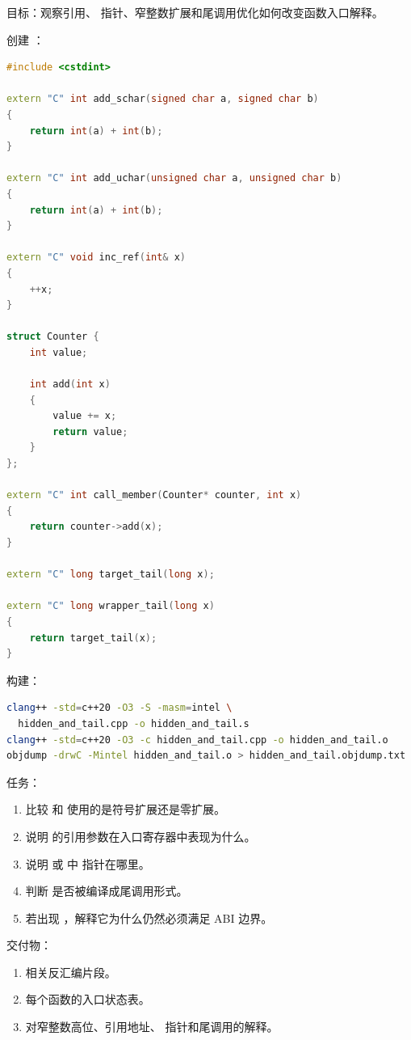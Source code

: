 \begin{labbox}
目标：观察引用、 指针、窄整数扩展和尾调用优化如何改变函数入口解释。

创建 ：

\begin{lstlisting}[language=C++]
#include <cstdint>

extern "C" int add_schar(signed char a, signed char b)
{
    return int(a) + int(b);
}

extern "C" int add_uchar(unsigned char a, unsigned char b)
{
    return int(a) + int(b);
}

extern "C" void inc_ref(int& x)
{
    ++x;
}

struct Counter {
    int value;

    int add(int x)
    {
        value += x;
        return value;
    }
};

extern "C" int call_member(Counter* counter, int x)
{
    return counter->add(x);
}

extern "C" long target_tail(long x);

extern "C" long wrapper_tail(long x)
{
    return target_tail(x);
}
\end{lstlisting}

构建：

\begin{lstlisting}[language=bash]
clang++ -std=c++20 -O3 -S -masm=intel \
  hidden_and_tail.cpp -o hidden_and_tail.s
clang++ -std=c++20 -O3 -c hidden_and_tail.cpp -o hidden_and_tail.o
objdump -drwC -Mintel hidden_and_tail.o > hidden_and_tail.objdump.txt
\end{lstlisting}

任务：

\begin{enumerate}
  \item 比较  和  使用的是符号扩展还是零扩展。
  \item 说明  的引用参数在入口寄存器中表现为什么。
  \item 说明  或  中  指针在哪里。
  \item 判断 \code{wrapper_tail} 是否被编译成尾调用形式。
  \item 若出现 ，解释它为什么仍然必须满足 ABI 边界。
\end{enumerate}

交付物：

\begin{enumerate}
  \item 相关反汇编片段。
  \item 每个函数的入口状态表。
  \item 对窄整数高位、引用地址、 指针和尾调用的解释。
\end{enumerate}
\end{labbox}

